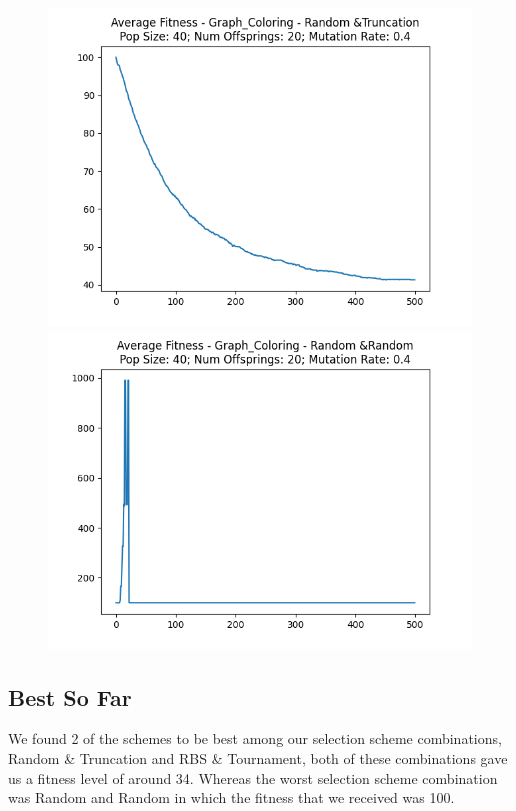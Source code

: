\documentclass[12pt]{report}
\theoremstyle{mytheoremstyle}
\theoremstyle{mytheoremstyle}
\theoremstyle{myproblemstyle}
\begin{document}
\begin{figure}[!]
\begin{minipage}{0.4\textwidth}
		\includegraphics[width=\linewidth]{../Analysis/ASF_Graph_Coloring_4_3_40_20.png}
	\end{minipage}
	\hspace{\fill}
	\begin{minipage}{0.4\textwidth}
		\includegraphics[width=\linewidth]{../Analysis/ASF_Graph_Coloring_4_4_40_20.png}
	\end{minipage}
	\vspace*{1cm}
\end{figure}
\newpage

\subsection{Best So Far}
We found 2 of the schemes to be best among our selection scheme combinations, Random \& Truncation and RBS \& Tournament, both of these combinations gave us a fitness level of around 34. Whereas the worst selection scheme combination was Random and Random in which the fitness that we received was 100.
\end{document}
